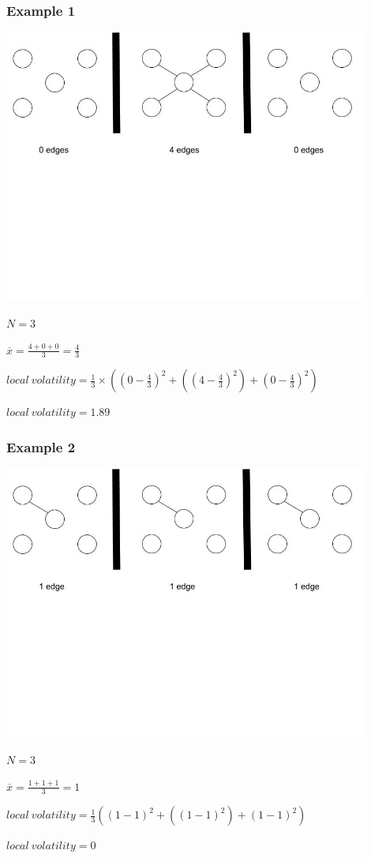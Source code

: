 \begin{center}
\subsubsection*{Example 1}
\includegraphics[trim={0 10cm 0 -1cm}, width=120mm]{./Figures/volatility1.jpg}

$N = 3$

$\overline{x} = \frac{4 + 0 + 0}{3} = \frac{4}{3}$

$local\ volatility =\frac{1}{3}\times((0 - \frac{4}{3})^2 + ((4 - \frac{4}{3})^2) + (0 - \frac{4}{3})^2) $

$local\ volatility = 1.89$

\subsubsection*{Example 2}
\includegraphics[trim={0 10cm 0 -1cm}, width=120mm]{./Figures/volatility2.jpg}

$N = 3$

$\overline{x} = \frac{1 + 1 + 1}{3} = 1$

$local\ volatility =\frac{1}{3}((1 - 1)^2 + ((1 - 1)^2) + (1 - 1)^2) $

$local\ volatility = 0$
\end{center}

